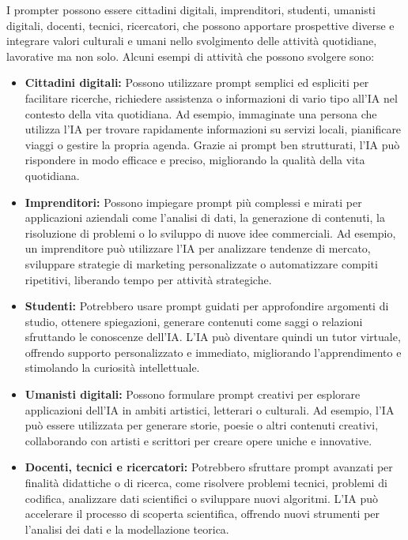     I prompter possono essere cittadini digitali, imprenditori, studenti, umanisti digitali, docenti, tecnici, ricercatori, che possono apportare prospettive diverse e integrare valori culturali e umani nello svolgimento delle attività quotidiane, lavorative ma non solo. Alcuni esempi di attività che possono svolgere sono:
    \begin{itemize}
        \item \textbf{Cittadini digitali:} Possono utilizzare prompt semplici ed espliciti per facilitare ricerche, richiedere assistenza o informazioni di vario tipo all'IA nel contesto della vita quotidiana. Ad esempio, immaginate una persona che utilizza l'IA per trovare rapidamente informazioni su servizi locali, pianificare viaggi o gestire la propria agenda. Grazie ai prompt ben strutturati, l'IA può rispondere in modo efficace e preciso, migliorando la qualità della vita quotidiana.

        \item \textbf{Imprenditori:} Possono impiegare prompt più complessi e mirati per applicazioni aziendali come l'analisi di dati, la generazione di contenuti, la risoluzione di problemi o lo sviluppo di nuove idee commerciali. Ad esempio, un imprenditore può utilizzare l'IA per analizzare tendenze di mercato, sviluppare strategie di marketing personalizzate o automatizzare compiti ripetitivi, liberando tempo per attività strategiche.

        \item \textbf{Studenti:} Potrebbero usare prompt guidati per approfondire argomenti di studio, ottenere spiegazioni, generare contenuti come saggi o relazioni sfruttando le conoscenze dell'IA. L'IA può diventare quindi un tutor virtuale, offrendo supporto personalizzato e immediato, migliorando l'apprendimento e stimolando la curiosità intellettuale.

        \item \textbf{Umanisti digitali:} Possono formulare prompt creativi per esplorare applicazioni dell'IA in ambiti artistici, letterari o culturali. Ad esempio, l'IA può essere utilizzata per generare storie, poesie o altri contenuti creativi, collaborando con artisti e scrittori per creare opere uniche e innovative.

        \item \textbf{Docenti, tecnici e ricercatori:} Potrebbero sfruttare prompt avanzati per finalità didattiche o di ricerca, come risolvere problemi tecnici, problemi di codifica, analizzare dati scientifici o sviluppare nuovi algoritmi. L'IA può accelerare il processo di scoperta scientifica, offrendo nuovi strumenti per l'analisi dei dati e la modellazione teorica.
    \end{itemize}

